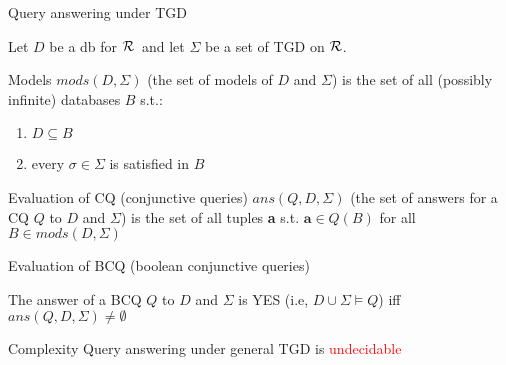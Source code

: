 \documentclass{beamer}
\def\R{\hbox{${\cal{R}}$}}
\begin{document}
 
 \small
 \begin{frame}{Query answering under TGD}
 
 \tiny
 Let $D$ be a db for \R\, and let   $\Sigma$  be  a set of TGD  on \R.
 
 \begin{block}{Models}
$mods(D, \Sigma)$ (the set of models of $D$ and $\Sigma$) is the set of all (possibly infinite) databases $B$ s.t.:
 \begin{enumerate}
 \item $D \subseteq B$
 \item every $\sigma \in \Sigma$ is satisfied in $B$
 \end{enumerate}
 
 \end{block}
 
 \begin{block}{Evaluation of CQ (conjunctive queries)}
  $ans(Q,D, \Sigma)$ (the set of answers for a CQ $Q$ to $D$ and $\Sigma$) is the set of all tuples \textbf{a} s.t.
 $\textbf{a} \in Q(B)$ for all $B \in mods (D, \Sigma)$ 
 \end{block}

 
 \begin{block}{Evaluation of  BCQ (boolean conjunctive queries)}
 
 The answer of a BCQ $Q$ to $D$ and $\Sigma$ is YES (i.e, $D \cup \Sigma \models Q$) iff $ans(Q,D,\Sigma) \neq \emptyset$
 
 \end{block}
 
 \begin{block}{Complexity}
 Query answering under general TGD is \textcolor{red}{undecidable}
 \end{block}
 
 
 \end{frame}
 
\end{document}
